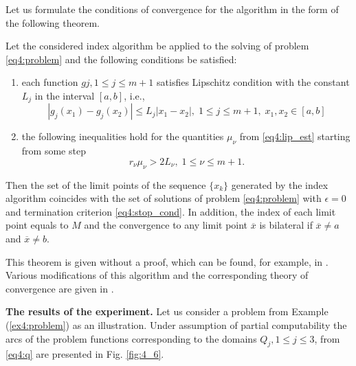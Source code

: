 Let us formulate the conditions of convergence for the algorithm in the form of the following theorem.
\begin{theorem}
Let the considered index algorithm be applied to the solving of problem \eqref{eq4:problem} and the following conditions be satisfied:
\begin{enumerate}
  \item each function $gj, 1\le j\le m+1$ satisfies Lipschitz condition with the constant $L_j$ in the interval $[a,b]$, i.e.,
  \[
  |g_j(x_1)-g_j(x_2)|\le L_j|x_1-x_2|,\; 1\le j\le m+1,\; x_1,x_2 \in[a,b]
  \]
  \item the following inequalities hold for the quantities $\mu_\nu$ from \eqref{eq4:lip_est} starting from some step
  \[
  r_\nu\mu_\nu > 2L_\nu,\; 1\le\nu \leq m+1.
  \]
\end{enumerate}

Then the set of the limit points of the sequence $\{x_k\}$ generated by the index algorithm coincides with the set of solutions of problem \eqref{eq4:problem} with $\epsilon=0$ and termination criterion \eqref{eq4:stop_cond}. In addition, the index of each limit point equals to $M$ and the convergence to any limit point $\overline{x}$  is bilateral if $\overline{x}\not=a$ and $\overline{x}\not=b$.
\end{theorem}

This theorem is given without a proof, which can be found, for example, in \cite{stronginMarkin1986, stronginMarkin1987}. Various modifications of this algorithm and the corresponding theory of convergence are given in \cite{SergeyevFamularoPugliese2001,barkalovStrongin2002,SergeyevFamularoPugliese2003,sergeyev2006,sergeyevKhalafKvasov2007,sergeyevKvasovKhalaf2007}.

\textbf{The results of the experiment.} Let us consider a problem from Example (\ref{ex4:problem}) as an illustration. Under assumption of partial computability the arcs of the problem functions corresponding to the domains $Q_j, 1\le j\le 3$, from \eqref{eq4:q} are presented in Fig. \ref{fig:4_6}.


